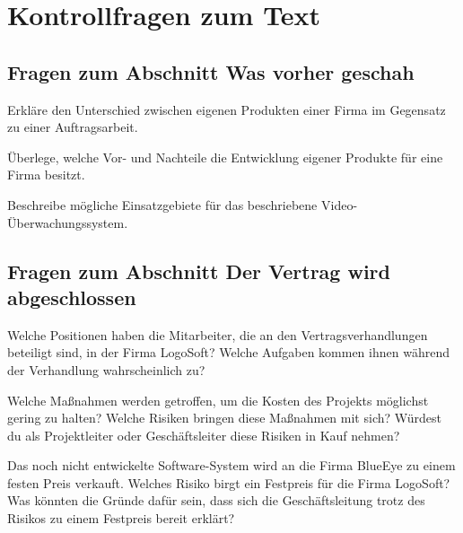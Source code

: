 \clearpage

\rehead[]{\textcolor{lightblue}{AvHG, Inf, My}}
\lohead[]{\textcolor{lightblue}{AvHG, Inf, My}}

\section{Kontrollfragen zum Text}

\subsection*{Fragen zum Abschnitt \glqq Was vorher geschah\grqq}
\begin{compactenum}[a)]
\item Erkläre den Unterschied zwischen eigenen Produkten einer Firma im
Gegensatz zu einer Auftragsarbeit.
\item Überlege, welche Vor- und Nachteile die Entwicklung eigener Produkte für
eine Firma besitzt.
\item Beschreibe mögliche Einsatzgebiete für das beschriebene
Video-Überwachungssystem.
\end{compactenum}

\subsection*{Fragen zum Abschnitt \glqq Der Vertrag wird abgeschlossen\grqq}
\begin{compactenum}[a)]
\item Welche Positionen haben die Mitarbeiter, die an den Vertragsverhandlungen
beteiligt sind, in der Firma LogoSoft? Welche Aufgaben kommen ihnen während der
Verhandlung wahrscheinlich zu? 
\item Welche Maßnahmen werden getroffen, um die Kosten des Projekts möglichst
gering zu halten? Welche Risiken bringen diese Maßnahmen mit sich? Würdest du
als Projektleiter oder Geschäftsleiter diese Risiken in Kauf nehmen?
\item Das noch nicht entwickelte Software-System wird an die Firma BlueEye zu
einem festen Preis verkauft. Welches Risiko birgt ein Festpreis für die Firma
LogoSoft? Was könnten die Gründe dafür sein, dass sich die Geschäftsleitung
trotz des Risikos zu einem Festpreis bereit erklärt?
\end{compactenum}

